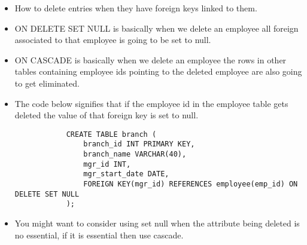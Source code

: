 \begin{itemize}
    \item How to delete entries when they have foreign keys linked to them.
    \item ON DELETE SET NULL is basically when we delete an employee all foreign associated to that employee is going to be set to null.
    \item ON CASCADE is basically when we delete an employee the rows in other tables containing employee ids pointing to the deleted employee are also going to get eliminated.
    \item The code below signifies that if the employee id in the employee table gets deleted the value of that foreign key is set to null. 
        \begin{verbatim}
            CREATE TABLE branch (
                branch_id INT PRIMARY KEY,
                branch_name VARCHAR(40),
                mgr_id INT,
                mgr_start_date DATE,
                FOREIGN KEY(mgr_id) REFERENCES employee(emp_id) ON DELETE SET NULL
            );
        \end{verbatim}
    
    \item You might want to consider using set null when the attribute being deleted is no essential, if it is essential then use cascade.
\end{itemize}
